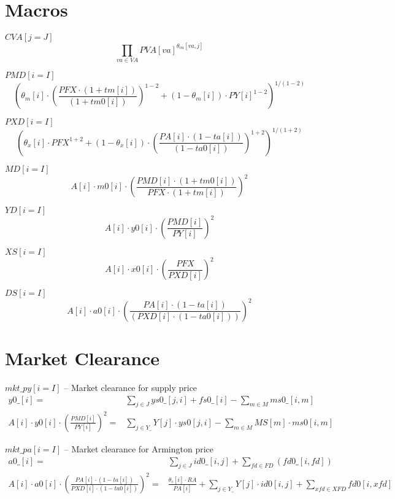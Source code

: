 \documentclass{amsart}
\begin{document}
\newpage
\section{Macros}

$CVA[j=J]$
\[
\prod_{va\in VA}PVA[va]^{\theta_{va}[va,j]}
\]

$PMD[i=I]$
\[
\left(\theta_m[i]\cdot \left(\frac{PFX\cdot (1+tm[i])}{(1+tm0[i])}\right)^{1-2} + (1-\theta_m[i])\cdot PY[i]^{1-2}\right)^{1/(1-2)}
\]

$PXD[i=I]$
\[
\left(\theta_x[i]\cdot PFX^{1+2} + (1-\theta_x[i])\cdot \left(\frac{PA[i]\cdot (1-ta[i])}{(1-ta0[i])}\right)^{1+2}\right)^{1/(1+2)}
\]

$MD[i=I]$
\[
A[i]\cdot m0[i]\cdot \left( \frac{PMD[i]\cdot (1+tm0[i])}{PFX\cdot (1+tm[i])} \right)^2
\]

$YD[i=I]$
\[
A[i]\cdot y0[i]\cdot \left(\frac{PMD[i]}{PY[i]}\right)^2
\]

$XS[i=I]$
\[
A[i]\cdot x0[i]\cdot \left(\frac{PFX}{PXD[i]}\right)^2
\]

$DS[i = I]$
\[
A[i]\cdot a0[i]\cdot \left(\frac{PA[i]\cdot (1-ta[i])}{(PXD[i]\cdot (1-ta0[i]))}\right)^2
\]

\newpage

\section{Market Clearance}



$mkt\_py[i=I]$ -- Market clearance for supply price
\begin{align*}
    y0\_[i] = & \sum_{j\in J}ys0\_[j,i] + fs0\_[i] - \sum_{m\in M}ms0\_[i,m] \\ 
    A[i]\cdot y0[i]\cdot \left(\frac{PMD[i]}{PY[i]}\right)^2 =&  \sum_{j\in  Y\_} Y[j]\cdot ys0[j,i] - \sum_{m\in M}MS[m]\cdot ms0[i,m] 
\end{align*}

\vspace{1cm}

$mkt\_pa[i=I]$ -- Market clearance for Armington price
\begin{align*}
    a0\_[i] =& \sum_{j\in J}id0\_[i,j] + \sum_{fd\in FD}(fd0\_[i,fd]) \\
    A[i]\cdot a0[i]\cdot \left(\frac{PA[i]\cdot (1-ta[i])}{PXD[i]\cdot(1-ta0[i])}\right)^2 =& \frac{\theta_c[i]\cdot  RA}{PA[i]}  
+ \sum_{j\in Y\_}Y[j]\cdot id0[i,j] + \sum_{xfd\in XFD}fd0[i,xfd]
\end{align*}
\end{document}

